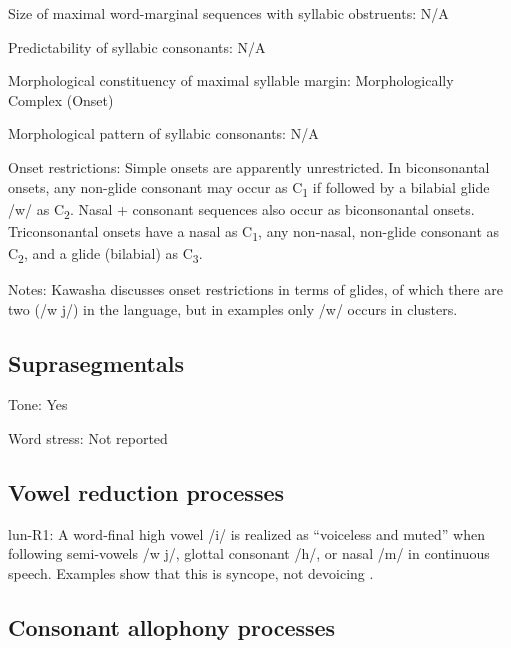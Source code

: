 {\begin{appendixdesc}
\item[Size of maximal word-marginal sequences with syllabic obstruents:] N/A

\item[Predictability of syllabic consonants:] N/A

\item[Morphological constituency of maximal syllable margin:] Morphologically Complex (Onset)

\item[Morphological pattern of syllabic consonants:] N/A

\item[Onset restrictions:] Simple onsets are apparently unrestricted. In biconsonantal onsets, any non-glide consonant may occur as C\textsubscript{1} if followed by a bilabial glide /w/ as C\textsubscript{2}. Nasal + consonant sequences also occur as biconsonantal onsets. Triconsonantal onsets have a nasal as C\textsubscript{1}, any non-nasal, non-glide consonant as C\textsubscript{2}, and a glide (bilabial) as C\textsubscript{3}.

\item[Notes:] Kawasha discusses onset restrictions in terms of glides, of which there are two (/w j/) in the language, but in examples only /w/ occurs in clusters.
\end{appendixdesc}
\subsection*{Suprasegmentals}
\begin{appendixdesc}
\item[Tone:] Yes

\item[Word stress:] Not reported
\end{appendixdesc}
\subsection*{Vowel reduction processes}
\begin{appendixdesc}

\item[lun-R1:] A word-final high vowel /i/ is realized as “voiceless and muted” when following semi-vowels /w j/, glottal consonant /h/, or nasal /m/ in continuous speech. Examples show that this is syncope, not devoicing \citep[37--38]{Kawasha2003}.
\end{appendixdesc}
\subsection*{Consonant allophony processes}

}
